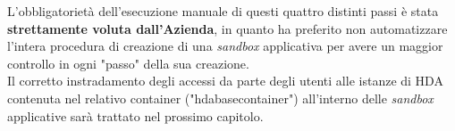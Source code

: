 L'obbligatorietà dell'esecuzione manuale di questi quattro distinti passi è stata \textbf{strettamente voluta dall'Azienda}, in quanto ha preferito non automatizzare l'intera procedura di creazione di una \textit{sandbox} applicativa per avere un maggior controllo in ogni "passo" della sua creazione.\\
Il corretto instradamento degli accessi da parte degli utenti alle istanze di HDA contenuta nel relativo container ("hdabasecontainer") all'interno delle \textit{sandbox} applicative sarà trattato nel prossimo capitolo.







